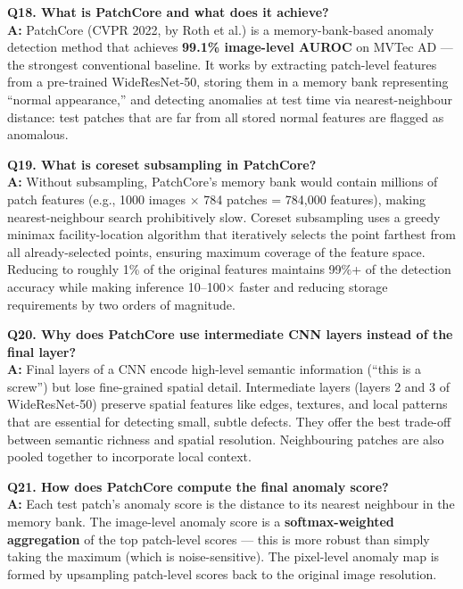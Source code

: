 \documentclass[12pt, a4paper]{article}
\begin{document}
\begin{qa}
\textbf{Q18. What is PatchCore and what does it achieve?}\\[4pt]
\textbf{A:} PatchCore (CVPR 2022, by Roth et al.) is a memory-bank-based anomaly detection method that achieves \textbf{99.1\% image-level AUROC} on MVTec AD --- the strongest conventional baseline. It works by extracting patch-level features from a pre-trained WideResNet-50, storing them in a memory bank representing ``normal appearance,'' and detecting anomalies at test time via nearest-neighbour distance: test patches that are far from all stored normal features are flagged as anomalous.
\end{qa}

\begin{qa}
\textbf{Q19. What is coreset subsampling in PatchCore?}\\[4pt]
\textbf{A:} Without subsampling, PatchCore's memory bank would contain millions of patch features (e.g., 1000 images $\times$ 784 patches = 784,000 features), making nearest-neighbour search prohibitively slow. Coreset subsampling uses a greedy minimax facility-location algorithm that iteratively selects the point farthest from all already-selected points, ensuring maximum coverage of the feature space. Reducing to roughly 1\% of the original features maintains 99\%+ of the detection accuracy while making inference 10--100$\times$ faster and reducing storage requirements by two orders of magnitude.
\end{qa}

\begin{qa}
\textbf{Q20. Why does PatchCore use intermediate CNN layers instead of the final layer?}\\[4pt]
\textbf{A:} Final layers of a CNN encode high-level semantic information (``this is a screw'') but lose fine-grained spatial detail. Intermediate layers (layers 2 and 3 of WideResNet-50) preserve spatial features like edges, textures, and local patterns that are essential for detecting small, subtle defects. They offer the best trade-off between semantic richness and spatial resolution. Neighbouring patches are also pooled together to incorporate local context.
\end{qa}

\begin{qa}
\textbf{Q21. How does PatchCore compute the final anomaly score?}\\[4pt]
\textbf{A:} Each test patch's anomaly score is the distance to its nearest neighbour in the memory bank. The image-level anomaly score is a \textbf{softmax-weighted aggregation} of the top patch-level scores --- this is more robust than simply taking the maximum (which is noise-sensitive). The pixel-level anomaly map is formed by upsampling patch-level scores back to the original image resolution.
\end{qa}
\end{document}
